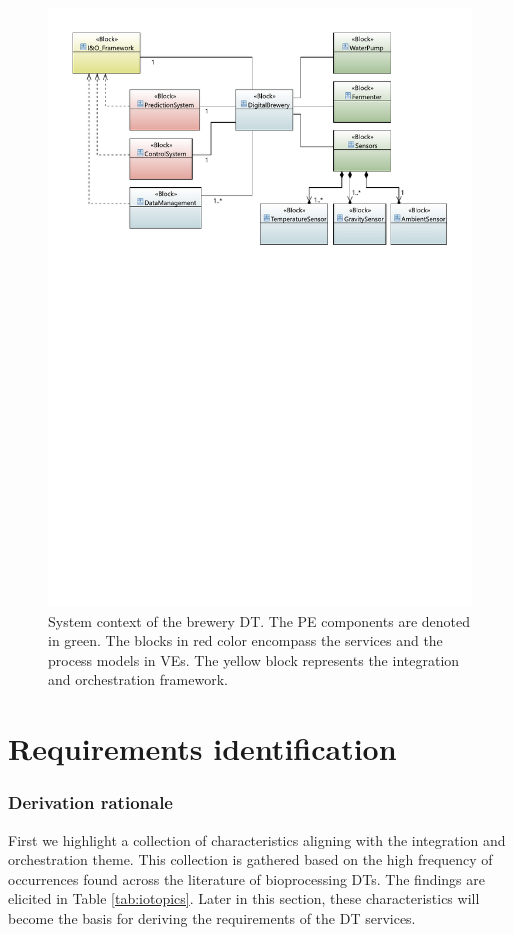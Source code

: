 \begin{figure}[hbt!]
  \centering
  \includegraphics[scale=0.75]{figures/systemcontext.pdf}
  \caption[System context of the brewery DT]{System context of the brewery DT. The PE components are denoted in green. The blocks in red color encompass the services and the process models in VEs. The yellow block represents the integration and orchestration framework.}
  \label{fig:systemcontext}
\end{figure}

\newpage
\section{Requirements identification}\label{ch:req}
\subsubsection{Derivation rationale}
First we highlight a collection of characteristics aligning with the integration and orchestration theme. This collection is gathered based on the high frequency of occurrences found across the literature of bioprocessing DTs. The findings are elicited in Table \ref{tab:iotopics}. Later in this section, these characteristics will become the basis for deriving the requirements of the DT services.

